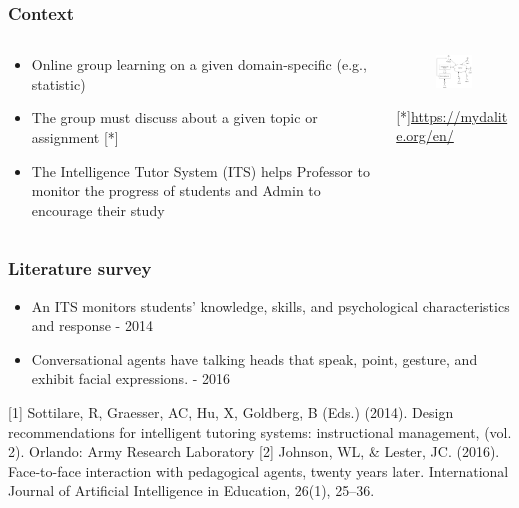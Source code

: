\documentclass{beamer}
\begin{document}
\begin{frame}
\frametitle{Context}
\begin{columns}
	\begin{column}{.55\textwidth}
		\begin{itemize}
			\item Online group learning on a given domain-specific (e.g., statistic)
			\item The group must discuss about a given topic or assignment [*] 
			\item The Intelligence Tutor System (ITS) helps Professor to monitor the progress of students and Admin to encourage their study
		\end{itemize}
	\end{column}
	\begin{column}{.45\textwidth}
		\begin{figure}
			\includegraphics[width=45mm]{se1.png}
		\end{figure}
{\tiny 	[*]\url{https://mydalite.org/en/}}
	\end{column}
\end{columns}

\end{frame}
\begin{frame}
\frametitle{Literature survey}
\begin{itemize}
\item An ITS monitors  students' knowledge, skills, and psychological
characteristics  and response \cite{Sottilare} - 2014
\item Conversational agents have talking heads that
speak, point, gesture, and exhibit facial expressions.
\cite{Johnson2016} - 2016
\end{itemize}
\begin{thebibliography}{01}
	{\scriptsize 	{} Sottilare, R, Graesser, AC, Hu, X, Goldberg, B (Eds.) (2014). Design recommendations
		for intelligent tutoring systems: instructional management, (vol. 2). Orlando:
		Army Research Laboratory
		 	Johnson, WL, \& Lester, JC. (2016). Face-to-face interaction with pedagogical
		agents, twenty years later. International Journal of Artificial Intelligence in
		Education, 26(1), 25–36. }
\end{thebibliography}

\end{frame}
\end{document}
